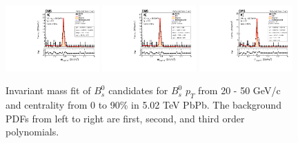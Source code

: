 \begin{figure}[hbtp]
\begin{center}
\includegraphics[width=0.32\textwidth]{Figures/Chapter4/data_PbPb_1_BptNew_2050_doubly0_0_90_background_1stEffInfoTreeFit.pdf}
\includegraphics[width=0.32\textwidth]{Figures/Chapter4/data_PbPb_1_BptNew_2050_doubly0_0_90_background_2ndEffInfoTreeFit.pdf}
\includegraphics[width=0.32\textwidth]{Figures/Chapter4/data_PbPb_1_BptNew_2050_doubly0_0_90_background_3rdEffInfoTreeFit.pdf}
\caption{Invariant mass fit of $B^0_s$ candidates for $B^0_s$ $p_T$ from 20 - 50 GeV/c and centrality from 0 to 90\% in 5.02 TeV PbPb. The background PDFs from left to right are first, second, and third order polynomials.}
\label{BsBkgdVar}
\end{center}
\end{figure}


